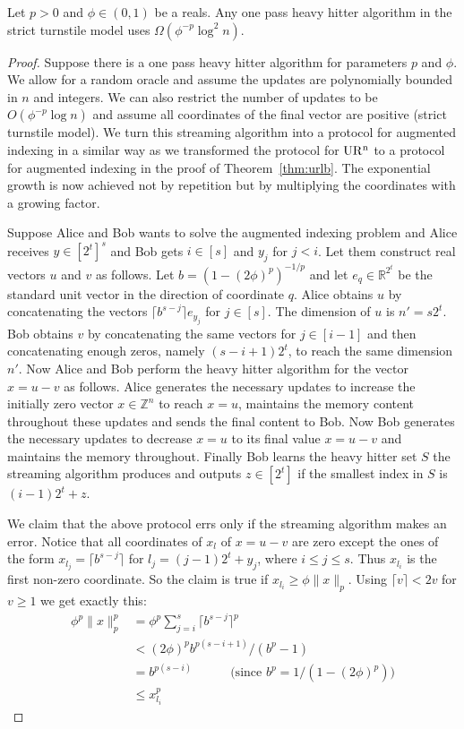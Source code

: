 \begin{theorem}\label{hhl} Let $p>0$ and $\phi\in(0,1)$ be a reals. Any one
  pass heavy hitter algorithm in the strict turnstile model uses
  $\Omega(\phi^{-p}\log^2n)$.
\end{theorem}

\begin{proof} Suppose there is a one pass heavy hitter algorithm for
  parameters $p$ and $\phi$. We allow for a
  random oracle and assume the updates are polynomially bounded in $n$ and
  integers. We can also restrict the number of updates to be $O(\phi^{-p}\log
  n)$ and assume all coordinates of the final vector are positive (strict
  turnstile model). We turn this streaming algorithm into a protocol for
  augmented indexing in a similar way as we transformed the protocol for
  $\operatorname{UR^n}$ to a protocol for augmented indexing in the proof of
  Theorem~\ref{thm:urlb}. The exponential growth is now achieved not by
  repetition but by multiplying the coordinates with a growing factor.

Suppose Alice and Bob wants to
solve the augmented indexing problem and Alice receives $y\in[2^t]^s$ and Bob
gets $i\in [s]$ and $y_j$ for $j<i$. Let them construct real vectors $u$ and
$v$ as follows. Let $b=(1-(2\phi)^p)^{-1/p}$ and let $e_q\in\mathbb R^{2^t}$
be the standard unit vector in the direction of coordinate $q$. Alice obtains
$u$ by concatenating the vectors $\lceil b^{s-j}\rceil e_{y_j}$ for
$j\in[s]$. The dimension of $u$ is $n'=s2^t$. Bob
obtains $v$ by concatenating the same vectors for $j\in[i-1]$ and then
concatenating enough zeros, namely $(s-i+1)2^t$, to reach the same dimension
$n'$. Now Alice and Bob perform the heavy hitter algorithm for the vector
$x=u-v$ as follows. Alice generates the necessary updates to increase the
initially zero vector $x\in\mathbb Z^n$ to reach $x=u$, maintains the memory
content throughout these updates and sends the final content to Bob. Now Bob
generates the necessary updates to decrease $x=u$ to its final value $x=u-v$
and maintains the memory throughout. Finally Bob learns the heavy hitter set
$S$ the streaming algorithm produces and outputs $z\in[2^t]$ if the smallest
index in $S$ is $(i-1)2^t+z$.

We claim that the above protocol errs only if the streaming algorithm makes an
error. Notice that all coordinates of $x_l$ of $x=u-v$ are zero except the
ones of the form $x_{l_j}=\lceil b^{s-j}\rceil$ for $l_j=(j-1)2^t+y_j$, where
$i\le j\le s$. Thus $x_{l_i}$ is the first non-zero coordinate. So the claim
is true if $x_{l_i}\ge\phi\|x\|_p$. Using $\lceil v\rceil<2v$ for $v\ge1$ we
get exactly this:
\begin{align*}
\phi^p\|x\|_p^p &= \phi^p\sum_{j=i}^s\lceil b^{s-j}\rceil^p\\
&<(2\phi)^pb^{p(s-i+1)}/(b^p-1)\\
&=b^{p(s-i)} \quad\qquad\text{(since $b^p =1/(1-(2\phi)^p)$)}\\
&\le x_{l_i}^p
\end{align*}


\end{proof}
